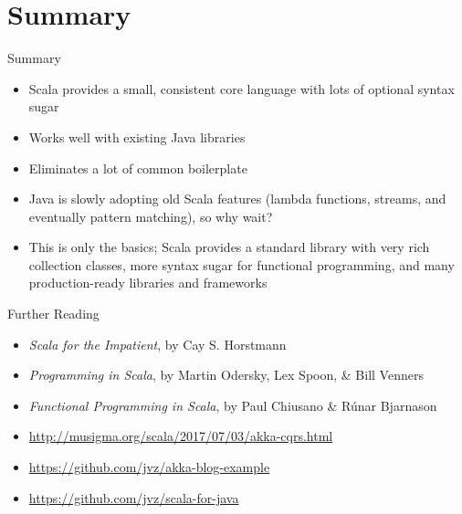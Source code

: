 \documentclass{beamer}
\begin{document}
\section*{Summary}

\begin{frame}{Summary}
\begin{itemize}
\item Scala provides a small, consistent core language with lots of optional
syntax sugar
\item Works well with existing Java libraries
\item Eliminates a lot of common boilerplate
\item Java is slowly adopting old Scala features (lambda functions, streams, and
eventually pattern matching), so why wait?
\item This is only the basics; Scala provides a standard library with very rich
collection classes, more syntax sugar for functional programming, and many
production-ready libraries and frameworks
\end{itemize}
\end{frame}

\begin{frame}{Further Reading}
\begin{itemize}
\item \textit{Scala for the Impatient}, by Cay S. Horstmann
\item \textit{Programming in Scala}, by Martin Odersky, Lex Spoon, \& Bill Venners
\item \textit{Functional Programming in Scala}, by Paul Chiusano \& R\'{u}nar Bjarnason
\item \url{http://musigma.org/scala/2017/07/03/akka-cqrs.html}
\item \url{https://github.com/jvz/akka-blog-example}
\item \url{https://github.com/jvz/scala-for-java}
\end{itemize}
\end{frame}
\end{document}
